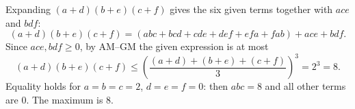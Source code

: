 Expanding $(a+d)(b+e)(c+f)$ gives the six given terms together with $ace$ and $bdf$:
\[
(a+d)(b+e)(c+f)=(abc+bcd+cde+def+efa+fab)+ace+bdf .
\]
Since $ace,bdf\ge0$, by AM--GM the given expression is at most
\[
(a+d)(b+e)(c+f)\le\left(\dfrac{(a+d)+(b+e)+(c+f)}{3}\right)^3=2^3=8 .
\]
Equality holds for $a=b=c=2$, $d=e=f=0$: then $abc=8$ and all other terms are $0$. The maximum is $\boxed{8}$.
